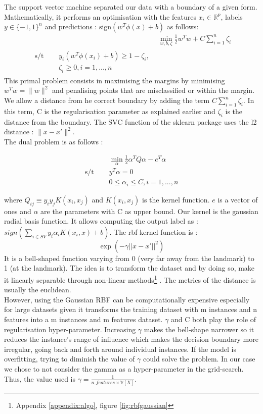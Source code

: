 The support vector machine separated our data with a boundary of a given form. Mathematically, it performs an optimisation with the features $x_i \in \mathbb R^p$, labels $y\in \{-1,1\}^n$ and  predictions : $\text{sign} (w^T\phi(x) + b)$ as follows: 
 \begin{align*} &\min_ {w, b, \zeta} \frac{1}{2} w^T w + C \sum_{i=1}^{n} \zeta_i \\
 \begin{split}\textrm {s/t }\quad & y_i (w^T \phi (x_i) + b) \geq 1 - \zeta_i,\\
& \zeta_i \geq 0, i=1, ..., n\end{split}\end{align*} 
This primal problem consists in maximising the margins by minimising $w^T w = \|w\|^2$ and penalising points that are misclassified or within the margin. We allow a distance from he correct boundary by adding the term $ C \sum_{i=1}^{n} \zeta_i$.  In this term, C is the regularisation parameter as explained earlier and $\zeta_i$ is the distance from the boundary. The SVC function of the sklearn package uses the l2 distance : $\|x-x'\|^2$. \\
The dual problem is as follows : 

	\begin{align*}&\min_{\alpha} \frac{1}{2} \alpha^T Q \alpha - e^T \alpha\\
\textrm {s/t  }\quad & y^T \alpha = 0\\
& 0 \leq \alpha_i \leq C, i=1, ..., n\end{align*}

where $Q_{ij} \equiv y_i y_j K(x_i, x_j)$ and $ K(x_i, x_j)$ is the kernel function. $e$ is a vector of ones and $\alpha$ are the parameters with C as upper bound. Our kernel is the gaussian radial basis function. It allows computing the output label as : $sign(\sum_{i\in SV} y_i \alpha_i K(x_i, x) + b)$. The rbf kernel function is : 
\begin{equation*} \exp (-\gamma ||x-x'||^2) \end{equation*}
It is a bell-shaped function varying from 0 (very far away from the landmark) to 1 (at the landmark). The idea is to transform the dataset and by doing so, make it linearly separable through non-linear methods\footnote{Appendix \ref{appendix:algo}, figure \ref{fig:rbfgaussian}} .
The metrics of the distance is usually the euclidean. \\


However, using the Gaussian RBF can be computationally expensive especially for large datasets given it transforms the training dataset with m instances and n features into a m instances and m features dataset.
$\gamma$ and C both play the role of regularisation hyper-parameter. Increasing $\gamma$ makes the bell-shape narrower so it reduces the instance's range of influence which makes the decision boundary more irregular, going back and forth around individual instances.
If the model is overfitting, trying to diminish the value of $\gamma$ could solve the problem. In our case we chose to not consider the gamma as a hyper-parameter in the grid-search. Thus, the value used is $\gamma= \frac{1}{n\_features\times \mathbb V[X]}$.